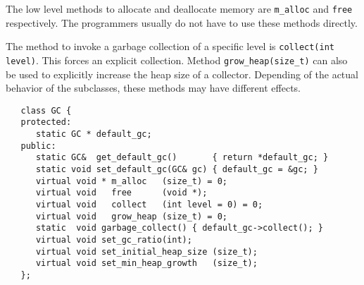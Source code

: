 The low level methods to allocate and deallocate memory are \verb|m_alloc|
and \verb|free| respectively.  The programmers usually do not have to
use these methods directly. 

The method to invoke a garbage collection of a specific level is 
\verb|collect(int level)|.  This forces an explicit collection.
Method \verb|grow_heap(size_t)| can also be used to explicitly increase
the heap size of a collector.  Depending of the actual behavior
of the subclasses, these methods may have different effects.

\begin{verbatim}
   class GC {
   protected:
      static GC * default_gc;
   public:
      static GC&  get_default_gc()       { return *default_gc; }
      static void set_default_gc(GC& gc) { default_gc = &gc; }
      virtual void * m_alloc   (size_t) = 0;
      virtual void   free      (void *);
      virtual void   collect   (int level = 0) = 0;
      virtual void   grow_heap (size_t) = 0;
      static  void garbage_collect() { default_gc->collect(); }
      virtual void set_gc_ratio(int);
      virtual void set_initial_heap_size (size_t);
      virtual void set_min_heap_growth   (size_t);
   };
\end{verbatim}

